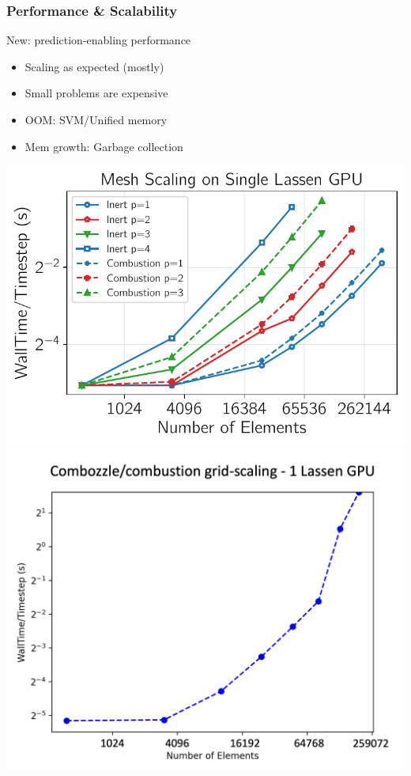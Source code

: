 \begin{frame}\frametitle{Performance \& Scalability}
\begin{minipage}[t][0.4\textheight][t]{\textwidth}
\begin{center}
New: prediction-enabling performance
\end{center}
\begin{multicols}{2}
\begin{itemize}
\item Scaling as expected (mostly)
\item Small problems are expensive
\columnbreak
\item OOM: SVM/Unified memory %
\item Mem growth: Garbage collection
\end{itemize}
\end{multicols}
\end{minipage}\vfill
\vspace{-20pt}
\begin{minipage}[t][0.4\textheight][t]{\textwidth}
\centering
\includegraphics[width=.4\textwidth]{Figures/mtc/combozzle_gridscale.pdf}\hspace{30pt}
\includegraphics[width=.4\textwidth]{Figures/mtc/comboz_gridscale_svm.png}
\end{minipage}
\end{frame}


